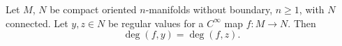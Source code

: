 Let $M$, $N$ be compact oriented $n$-manifolds without boundary, $n \geqslant 1$, with $N$ connected. Let $y, z \in N$ be regular values for a $C^{\infty}$ map $f \colon M \to N$. Then
$$\deg(f, y) = \deg(f, z).$$
